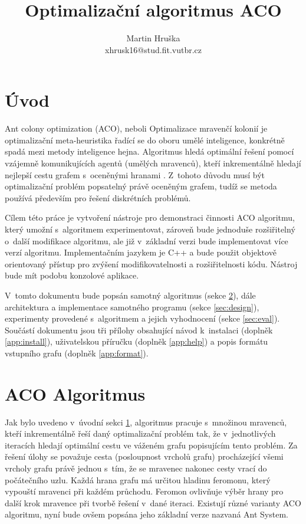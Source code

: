 \documentclass[a4paper, 12pt]{article}
\title{Optimalizační algoritmus ACO}
\author{Martin Hruška\\xhrusk16@stud.fit.vutbr.cz}
\date{}
\begin{document}
\maketitle

\section{Úvod}
\label{sec:intro}
Ant colony optimization (ACO), neboli Optimalizace mravenčí kolonií je optimalizační meta-heuristika řadící se do oboru umělé inteligence,
konkrétně spadá mezi metody inteligence hejna. Algoritmus hledá optimální řešení pomocí vzájemně komunikujících agentů (umělých mravenců), kteří
inkrementálně hledají nejlepší cestu grafem s~oceněnými hranami \cite{aco:main}. 
Z~tohoto důvodu musí být optimalizační problém popsatelný právě oceněným grafem, tudíž se metoda používá především pro řešení diskrétních problémů.

Cílem této práce je vytvoření nástroje pro demonstraci činnosti ACO algoritmu, který umožní s~algoritmem experimentovat, zároveň bude jednoduše rozšiřitelný
o~další modifikace algoritmu, ale již v~základní verzi bude implementovat více verzí algoritmu. Implementačním jazykem je C++ a bude použit objektově orientovaný
přístup pro zvýšení modifikovatelnosti a rozšiřitelnosti kódu. Nástroj bude mít podobu konzolové aplikace.

V~tomto dokumentu bude popsán samotný algoritmus (sekce \ref{sec:algorithm}), dále architektura a implementace samotného programu (sekce \ref{sec:design}),
experimenty provedené s~algoritmem a jejich vyhodnocení (sekce \ref{sec:eval}).
Součástí dokumentu jsou tři přílohy obsahující návod k~instalaci (doplněk \ref{app:install}),
uživatelskou příručku (doplněk \ref{app:help}) a popis formátu vstupního grafu (doplněk \ref{app:format}).

\section{ACO Algoritmus}
\label{sec:algorithm}
Jak bylo uvedeno v~úvodní sekci \ref{sec:intro}, algoritmus pracuje s~množinou mravenců, kteří inkrementálně řeší daný optimalizační problém tak, že
v~jednotlivých iteracích hledají optimální cestu ve váženém grafu popisujícím tento problém. Za řešení úlohy se považuje cesta (posloupnost vrcholů grafu)
procházející všemi vrcholy grafu právě
jednou s~tím, že se mravenec nakonec cesty vrací do počátečního uzlu. Každá hrana grafu má určitou hladinu feromonu, který vypouští mravenci při každém průchodu.
Feromon  ovlivňuje výběr hrany pro další krok mravence při tvorbě řešení v~dané iteraci.
Existují různé varianty ACO algoritmu, nyní bude ovšem popsána jeho základní verze nazvaná Ant System.
\end{document}
